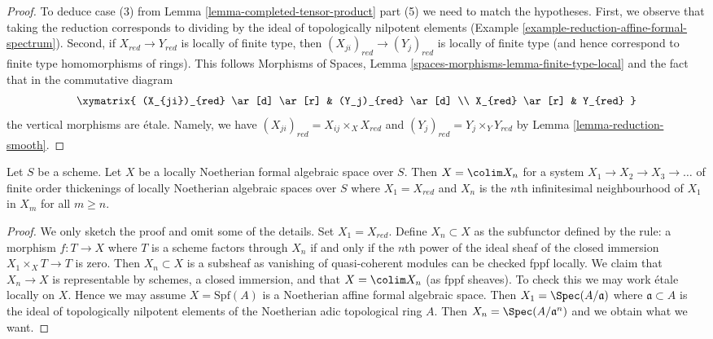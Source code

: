 \begin{proof}
\medskip\noindent
To deduce case (3) from Lemma \ref{lemma-completed-tensor-product} part (5)
we need to match the hypotheses. First, we observe that taking the
reduction corresponds to dividing by the ideal of topologically
nilpotent elements (Example \ref{example-reduction-affine-formal-spectrum}).
Second, if $X_{red} \to Y_{red}$ is locally of finite type, then
$(X_{ji})_{red} \to (Y_j)_{red}$ is locally of finite type
(and hence correspond to finite type homomorphisms of rings).
This follows
Morphisms of Spaces, Lemma \ref{spaces-morphisms-lemma-finite-type-local}
and the fact that in the commutative diagram
$$
\xymatrix{
(X_{ji})_{red} \ar[d] \ar[r] & (Y_j)_{red} \ar[d] \\
X_{red} \ar[r] & Y_{red}
}
$$
the vertical morphisms are \'etale. Namely, we have
$(X_{ji})_{red} = X_{ij} \times_X X_{red}$ and
$(Y_j)_{red} = Y_j \times_Y Y_{red}$
by Lemma \ref{lemma-reduction-smooth}.
\end{proof}

\begin{lemma}
\label{lemma-structure-locally-noetherian}
Let $S$ be a scheme. Let $X$ be a locally Noetherian formal algebraic space
over $S$. Then $X = \colim X_n$ for a system $X_1 \to X_2 \to X_3 \to \ldots$
of finite order thickenings of locally Noetherian algebraic spaces over $S$
where $X_1 = X_{red}$ and $X_n$ is the $n$th infinitesimal neighbourhood of
$X_1$ in $X_m$ for all $m \geq n$.
\end{lemma}

\begin{proof}
We only sketch the proof and omit some of the details.
Set $X_1 = X_{red}$. Define $X_n \subset X$ as the subfunctor
defined by the rule: a morphism $f : T \to X$ where $T$ is a scheme factors
through $X_n$ if and only if the $n$th power of the ideal sheaf
of the closed immersion $X_1 \times_X T \to T$ is zero. Then $X_n \subset X$
is a subsheaf as vanishing of quasi-coherent modules can be checked
fppf locally. We claim that $X_n \to X$ is representable by schemes,
a closed immersion, and that $X = \colim X_n$ (as fppf sheaves).
To check this we may work \'etale locally on $X$. Hence we may assume
$X = \text{Spf}(A)$ is a Noetherian affine formal algebraic space.
Then $X_1 = \Spec(A/\mathfrak a)$ where $\mathfrak a \subset A$
is the ideal of topologically nilpotent elements of the Noetherian
adic topological ring $A$. Then $X_n = \Spec(A/\mathfrak a^n)$
and we obtain what we want.
\end{proof}









